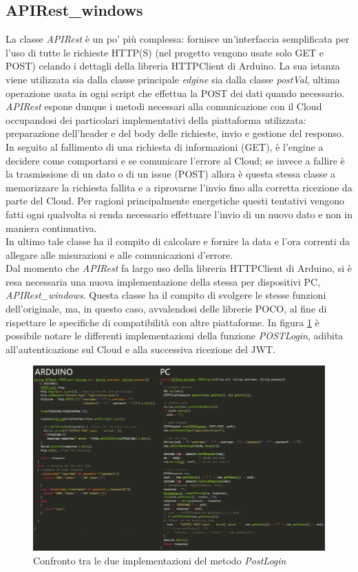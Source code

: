 \subsection{APIRest\_windows}
La classe \textit{APIRest} è un po' più complessa: fornisce un'interfaccia semplificata per l'uso di tutte le richieste HTTP(S) (nel progetto vengono usate solo GET e POST) celando i dettagli della libreria HTTPClient di Arduino. La sua istanza viene utilizzata sia dalla classe principale \textit{edgine} sia dalla classe \textit{postVal}, ultima operazione usata in ogni script che effettua la POST dei dati quando necessario. \textit{APIRest} espone dunque i metodi necessari alla comunicazione con il Cloud occupandosi dei particolari implementativi della piattaforma utilizzata: preparazione dell'header e del body delle richieste, invio e gestione del responso. In seguito al fallimento di una richiesta di informazioni (GET), è l'engine a decidere come comportarsi e se comunicare l'errore al Cloud; se invece a fallire è la trasmissione di un dato o di un issue (POST) allora è questa stessa classe a memorizzare la richiesta fallita e a riprovarne l'invio fino alla corretta ricezione da parte del Cloud. Per ragioni principalmente energetiche questi tentativi vengono fatti ogni qualvolta si renda necessario effettuare l'invio di un nuovo dato e non in maniera continuativa.\\
In ultimo tale classe ha il compito di calcolare e fornire la data e l'ora correnti da allegare alle misurazioni e alle comunicazioni d'errore.\\
Dal momento che \textit{APIRest} fa largo uso della libreria HTTPClient di Arduino, si è resa necessaria una nuova implementazione della stessa per dispositivi PC, \textit{APIRest\_windows}. Questa classe ha il compito di svolgere le stesse funzioni dell’originale, ma, in questo caso, avvalendosi delle librerie POCO, al fine di rispettare le specifiche di compatibilità con altre piattaforme. In figura \ref{APIRestAW} è possibile notare le differenti implementazioni della funzione \textit{POSTLogin}, adibita all'autenticazione sul Cloud e alla successiva ricezione del JWT.\\
\begin{figure}[H]
	\centering
	\includegraphics[width=\linewidth]{pics/APIRestAW}
	\caption{Confronto tra le due implementazioni del metodo \textit{PostLogin}}
	\label{APIRestAW}
\end{figure}
